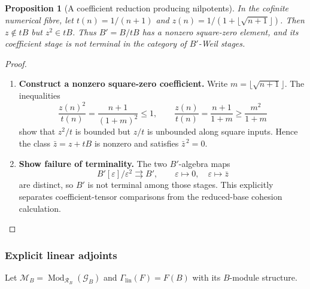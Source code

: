 \documentclass[11pt,a4paper]{article}
\numberwithin{algorithm}{section}
\numberwithin{equation}{section}
\newtheorem{proposition}[proposition]{Proposition}
\theoremstyle{definition}
\theoremstyle{remark}
\theoremstyle{plain}
\newcommand{\eps}{\varepsilon}
\newcommand{\Mod}{\operatorname{Mod}}
\newcommand{\Geo}{\mathcal G_B}
\newcommand{\Rline}{\mathcal R_B}
\newcommand{\Gamlin}{\Gamma_{\mathrm{lin}}}
\theoremstyle{definition}
\theoremstyle{plain}
\begin{document}
\begin{proposition}[A coefficient reduction producing nilpotents]
\label{prop:nonreduced-reduction}
In the cofinite numerical fibre, let $t(n)=1/(n+1)$ and
$z(n)=1/(1+\lfloor\sqrt{n+1}\rfloor)$.  Then
$z\notin tB$ but $z^2\in tB$.  Thus $B'=B/tB$ has a nonzero
square-zero element, and its coefficient stage is not terminal
in the category of $B'$-Weil stages.
\end{proposition}
\begin{proof}\leavevmode
\begin{enumerate}[leftmargin=*,align=left]
\item \textbf{Construct a nonzero square-zero coefficient.}
Write $m=\lfloor\sqrt{n+1}\rfloor$.  The inequalities
\[
 \frac{z(n)^2}{t(n)}=\frac{n+1}{(1+m)^2}\le1,
 \qquad
 \frac{z(n)}{t(n)}=\frac{n+1}{1+m}\ge\frac{m^2}{1+m}
\]
show that $z^2/t$ is bounded but $z/t$ is unbounded along
square inputs.  Hence the class $\bar z=z+tB$ is nonzero and
satisfies $\bar z^{\,2}=0$.

\item \textbf{Show failure of terminality.}
The two $B'$-algebra maps
\[
 B'[\eps]/\eps^2\rightrightarrows B',
 \qquad \eps\longmapsto0,\quad\eps\longmapsto\bar z
\]
are distinct, so $B'$ is not terminal among those stages.
This explicitly separates coefficient-tensor comparisons from
the reduced-base cohesion calculation.
\end{enumerate}
\end{proof}

\subsubsection{Explicit linear adjoints}
Let $\mathscr M_B=\Mod_{\Rline}(\Geo)$ and
$\Gamlin(F)=F(B)$ with its $B$-module structure.
\end{document}
